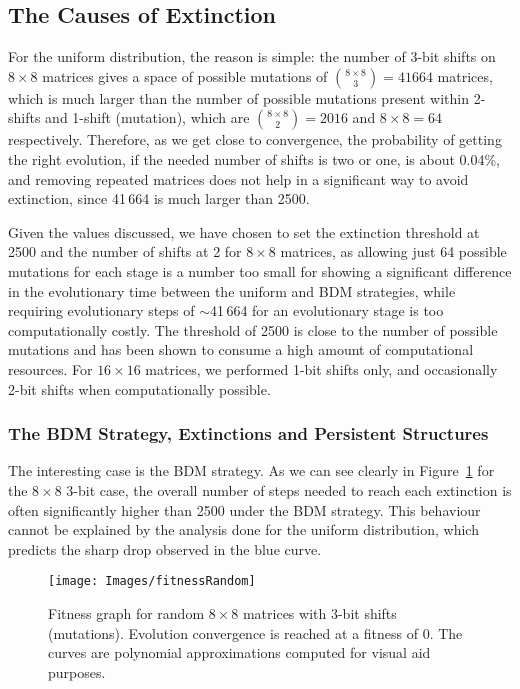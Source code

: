 \documentclass[10pt]{article}
\begin{document}
\subsection{The Causes of Extinction}\label{causes}

For the uniform distribution, the reason is simple: the number of 3-bit shifts on $8 \times 8$ matrices gives a space of possible mutations of \({{8 \times 8}\choose{3}} = 41664\) matrices, which is much larger than the number of possible mutations present within 2-shifts and 1-shift (mutation), which are \({{8 \times 8}\choose{2}} = 2016\) and \(8 \times 8 = 64\) respectively. Therefore, as we get close to convergence, the probability of getting the right evolution, if the needed number of shifts is two or one, is about 0.04\%, and removing repeated matrices does not help in a significant way to avoid extinction, since 41\,664 is much larger than 2500.

Given the values discussed, we have chosen to set the extinction threshold at 2500 and the number of shifts at 2 for \(8 \times 8\) matrices, as allowing just 64 possible mutations for each stage is a number too small for showing a significant difference in the evolutionary time between the uniform and BDM strategies, while requiring evolutionary steps of $\sim${}41\,664 for an evolutionary stage is too computationally costly. The threshold of 2500 is close to the number of possible mutations and has been shown to consume a high amount of computational resources. For $16 \times 16$ matrices, we performed 1-bit shifts only, and occasionally 2-bit shifts when computationally possible.

\subsubsection{The BDM Strategy, Extinctions and Persistent
    Structures}\label{persistentS}

The interesting case is the BDM strategy. As we can see clearly in Figure~\ref{fitnessR1} for the $8 \times 8$ 3-bit case, the overall number of steps needed to reach each extinction is often significantly higher than 2500 under the BDM strategy. This behaviour cannot be explained by the analysis done for the uniform distribution, which predicts the sharp drop observed in the blue curve.

\begin{figure}[ht!]
    \centering
    \texttt{[image: Images/fitnessRandom]}
    \caption{Fitness graph for random $8 \times 8$ matrices with 3-bit shifts (mutations). Evolution convergence is reached at a fitness of 0. The curves are polynomial approximations computed for visual aid purposes. \label{fitnessR1}}
\end{figure}
\end{document}
